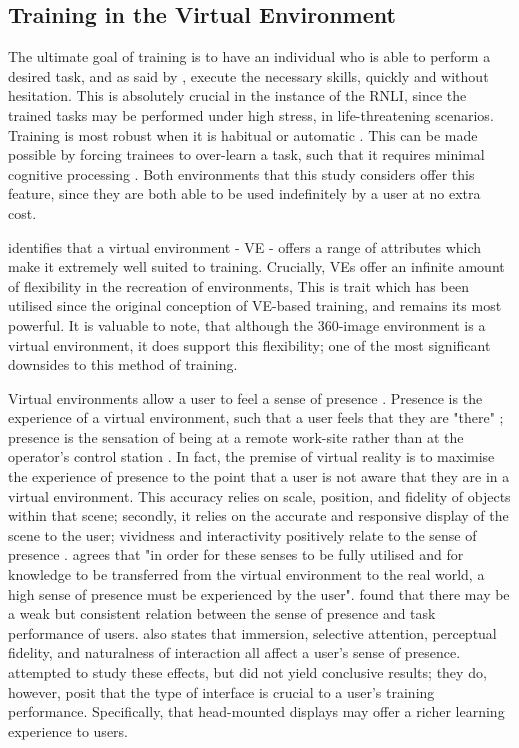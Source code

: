 \documentclass[ %
                    author={Elis Jones},
                supervisor={Dr. Kirsten Cater},
                    degree={BSc},
                     title={The Effect of Presentation Medium on Spatial Cognition},
                  subtitle={in the Virtual Environment},
                      year={2018} ]{dissertation}
\begin{document}
\subsection{Training in the Virtual Environment}
The ultimate goal of training is to have an individual who is able to perform a desired task, and as said by \cite{hussein}, execute the necessary skills, quickly and without hesitation. This is absolutely crucial in the instance of the RNLI, since the trained tasks may be performed under high stress, in life-threatening scenarios. Training is most robust when it is habitual or automatic \citep{hussein}. This can be made possible by forcing trainees to over-learn a task, such that it requires minimal cognitive processing  \citep{kirlik}. Both environments that this study considers offer this feature, since they are both able to be used indefinitely by a user at no extra cost. 

\citet{osberg} identifies that a virtual environment - VE - offers a range of attributes which make it extremely well suited to training. Crucially, VEs offer an infinite amount of flexibility in the recreation of environments, This is trait which has been utilised since the original conception of VE-based training, and remains its most powerful. It is valuable to note, that although the 360-image environment is a virtual environment, it does support this flexibility; one of the most significant downsides to this method of training. 

Virtual environments allow a user to feel a sense of presence \citep{osberg}. Presence is the experience of a virtual environment, such that a user feels that they are "there" \citep{steuer}; presence is the sensation of being at a remote work-site rather than at the operator's control station \citep{Witmer1998}. In fact, the premise of virtual reality is to maximise the experience of presence to the point that a user is not aware that they are in a virtual environment. This accuracy relies on scale, position, and fidelity  of objects within that scene; secondly, it relies on the accurate and responsive display of the scene to the user; vividness and interactivity positively relate to the sense of presence \citep{steuer}. \cite{Gupta2008} agrees that "in order for these senses to be fully utilised and for knowledge to be transferred from the virtual environment to the real world, a high sense of presence must be experienced by the user". \cite{Witmer1998} found that there may be a weak but consistent relation between the sense of presence and task performance of users. \cite{Witmer1998} also states that immersion, selective attention, perceptual fidelity, and naturalness of interaction all affect a user's sense of presence. \cite{Romano2001} attempted to study these effects, but did not yield conclusive results; they do, however, posit that the type of interface is crucial to a user's training performance. Specifically, that head-mounted displays may offer a richer learning experience to users.
\end{document}
